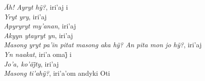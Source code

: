 \smallskip
 \begin{center}\end{center}
 \smallskip
\noindent \textit{Ãh! Ayryt hỹ?}, iri’aj i\\
\textit{Yryt yry}, iri'aj\\
\textit{Apyryryt my'anan}, iri'aj\\
\textit{Akyyn ytayryt yn}, iri'aj\\
\textit{Masong yryt pa’in pitat masong aka hỹ? An pita mon jo hỹ?}, iri’aj\\
\textit{Yn naakat}, iri’a omaj̃ i\\
\textit{Jo’a, ko’ãj̃ty}, iri’aj\\
\textit{Masong ti’ahỹ?}, iri’a’om andyki Oti

